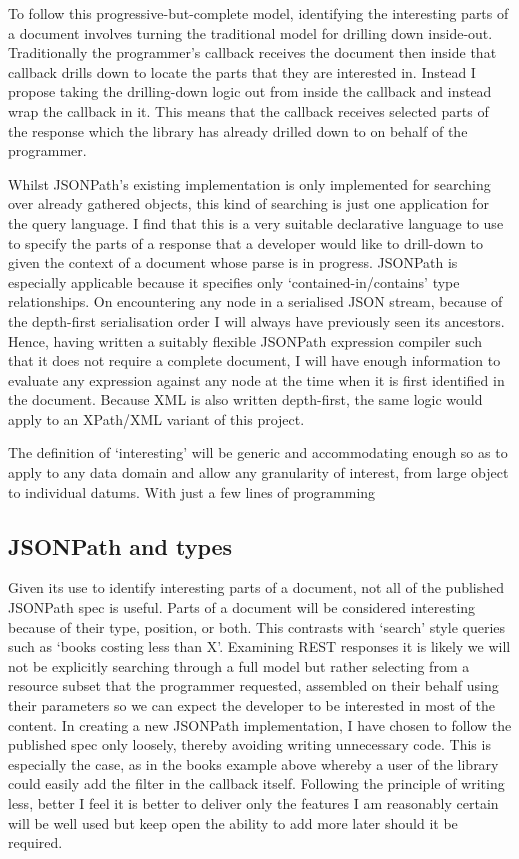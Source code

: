 \documentclass[]{article}
\begin{document}
To follow this progressive-but-complete model, identifying the
interesting parts of a document involves turning the traditional model
for drilling down inside-out. Traditionally the programmer's callback
receives the document then inside that callback drills down to locate
the parts that they are interested in. Instead I propose taking the
drilling-down logic out from inside the callback and instead wrap the
callback in it. This means that the callback receives selected parts of
the response which the library has already drilled down to on behalf of
the programmer.

Whilst JSONPath's existing implementation is only implemented for
searching over already gathered objects, this kind of searching is just
one application for the query language. I find that this is a very
suitable declarative language to use to specify the parts of a response
that a developer would like to drill-down to given the context of a
document whose parse is in progress. JSONPath is especially applicable
because it specifies only `contained-in/contains' type relationships. On
encountering any node in a serialised JSON stream, because of the
depth-first serialisation order I will always have previously seen its
ancestors. Hence, having written a suitably flexible JSONPath expression
compiler such that it does not require a complete document, I will have
enough information to evaluate any expression against any node at the
time when it is first identified in the document. Because XML is also
written depth-first, the same logic would apply to an XPath/XML variant
of this project.

The definition of `interesting' will be generic and accommodating enough
so as to apply to any data domain and allow any granularity of interest,
from large object to individual datums. With just a few lines of
programming

\subsection{JSONPath and types}

Given its use to identify interesting parts of a document, not all of
the published JSONPath spec is useful. Parts of a document will be
considered interesting because of their type, position, or both. This
contrasts with `search' style queries such as `books costing less than
X'. Examining REST responses it is likely we will not be explicitly
searching through a full model but rather selecting from a resource
subset that the programmer requested, assembled on their behalf using
their parameters so we can expect the developer to be interested in most
of the content. In creating a new JSONPath implementation, I have chosen
to follow the published spec only loosely, thereby avoiding writing
unnecessary code. This is especially the case, as in the books example
above whereby a user of the library could easily add the filter in the
callback itself. Following the principle of writing less, better I feel
it is better to deliver only the features I am reasonably certain will
be well used but keep open the ability to add more later should it be
required.
\end{document}
